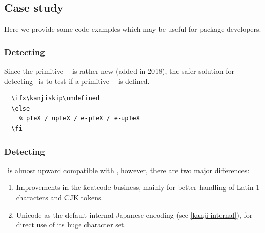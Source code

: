 \documentclass[a4paper,11pt,dvipdfmx]{article}
\begin{document}

\subsection{Case study}

Here we provide some code examples
which may be useful for package developers.

\subsubsection{Detecting \pTeX}

Since the primitive |\ptexversion| is rather new (added in 2018),
the safer solution for detecting \pTeX\ is
to test if a primitive |\kanjiskip| is defined.
\begin{verbatim}
  \ifx\kanjiskip\undefined
  \else
    % pTeX / upTeX / e-pTeX / e-upTeX
  \fi
\end{verbatim}

\subsubsection{Detecting \upTeX}\label{detecting-uptex}

\upTeX\ is almost upward compatible with \pTeX, however,
there are two major differences:
\begin{enumerate}
  \item Improvements in the \.{kcatcode} business,
    mainly for better handling of Latin-1 characters and CJK tokens.
  \item Unicode as the default internal Japanese encoding
    (see \ref{kanji-internal}),
    for direct use of its huge character set.
\end{enumerate}
\end{document}
